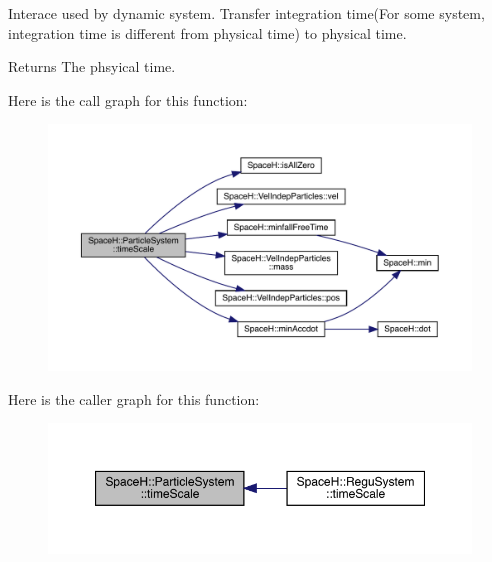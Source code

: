 Interace used by dynamic system. Transfer integration time(For some system, integration time is different from physical time) to physical time. \begin{DoxyReturn}{Returns}
The phsyical time. 
\end{DoxyReturn}
Here is the call graph for this function\+:
\nopagebreak
\begin{figure}[H]
\begin{center}
\leavevmode
\includegraphics[width=350pt]{class_space_h_1_1_particle_system_a48745701be46a42213d9b35c599bb10a_cgraph}
\end{center}
\end{figure}
Here is the caller graph for this function\+:
\nopagebreak
\begin{figure}[H]
\begin{center}
\leavevmode
\includegraphics[width=350pt]{class_space_h_1_1_particle_system_a48745701be46a42213d9b35c599bb10a_icgraph}
\end{center}
\end{figure}
\mbox{\label{class_space_h_1_1_particle_system_a9351bf7ed263b6624456e610fd351190}} 
